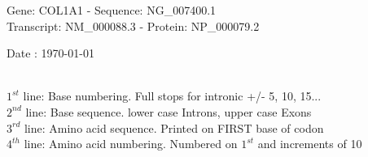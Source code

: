 \documentclass{article}
\begin{document}
\renewcommand{\footrulewidth}{1pt}
\renewcommand{\headrulewidth}{0pt}
\begin{center}
\begin{large}
Gene: COL1A1 - Sequence: NG\_007400.1\\
Transcript: NM\_000088.3 - Protein: NP\_000079.2
 
 Date : \today\\\\
\end{large}
\end{center}
$1^{st}$ line: Base numbering. Full stops for intronic +/- 5, 10, 15...\\
$2^{nd}$ line: Base sequence. lower case Introns, upper case Exons\\
$3^{rd}$ line: Amino acid sequence. Printed on FIRST base of codon\\
$4^{th}$ line: Amino acid numbering. Numbered on $1^{st}$ and increments of 10\\
\end{document}
